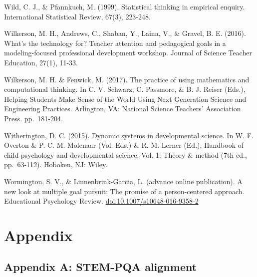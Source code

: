 \documentclass[]{book}
\theoremstyle{definition}
\theoremstyle{definition}
\theoremstyle{definition}
\theoremstyle{remark}
\begin{document}
Wild, C. J., \& Pfannkuch, M. (1999). Statistical thinking in empirical
enquiry. International Statistical Review, 67(3), 223-248.

Wilkerson, M. H., Andrews, C., Shaban, Y., Laina, V., \& Gravel, B. E.
(2016). What's the technology for? Teacher attention and pedagogical
goals in a modeling-focused professional development workshop. Journal
of Science Teacher Education, 27(1), 11-33.

Wilkerson, M. H. \& Fenwick, M. (2017). The practice of using
mathematics and computational thinking. In C. V. Schwarz, C. Passmore,
\& B. J. Reiser (Eds.), Helping Students Make Sense of the World Using
Next Generation Science and Engineering Practices. Arlington, VA:
National Science Teachers' Association Press. pp.~181-204.

Witherington, D. C. (2015). Dynamic systems in developmental science. In
W. F. Overton \& P. C. M. Molenaar (Vol. Eds.) \& R. M. Lerner (Ed.),
Handbook of child psychology and developmental science. Vol. 1: Theory
\& method (7th ed., pp.~63-112). Hoboken, NJ: Wiley.

Wormington, S. V., \& Linnenbrink-Garcia, L. (advance online
publication). A new look at multiple goal pursuit: The promise of a
person-centered approach. Educational Psychology Review.
\url{doi:10.1007/s10648-016-9358-2}

\chapter{Appendix}\label{appendix}

\section{Appendix A: STEM-PQA
alignment}\label{appendix-a-stem-pqa-alignment}
\end{document}
